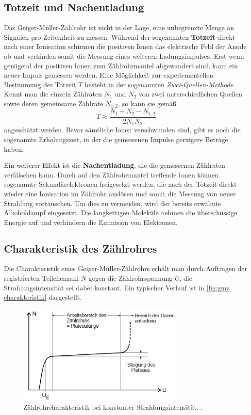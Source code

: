 \subsection{Totzeit und Nachentladung}
Das Geiger-Müller-Zählrohr ist nicht in der Lage, eine unbegrenzte Menge an Signalen pro Zeiteinheit zu messen.
Während der sogenannten \textbf{Totzeit} direkt nach einer Ionisation schirmen die positiven Ionen das elektrische Feld der Anode ab
und verhinden somit die Messung eines weiteren Ladungsimpulses.
Erst wenn genügend der positiven Ionen zum Zählrohrmantel abgewandert sind, kann ein neuer Impuls gemessen werden.
Eine Möglichkeit zur experiementellen Bestimmung der Totzeit $T$ besteht in der sogenannten \textit{Zwei-Quellen-Methode}.
Kennt man die einzeln Zählraten $N_1$ und $N_2$ von zwei unterschiedlichen Quellen sowie deren gemeinsame
Zählrate $N_{1,2}$, so kann sie gemäß
\begin{equation}
    \label{eq:2 Quellen}
    T \approx \frac{N_1 + N_2 - N_{1,2}}{2N_1 N_2}
\end{equation}
angeschätzt werden.
Bevor sämtliche Ionen verschwunden sind, gibt es noch die sogenannte Erholungszeit, in der die gemessenen Impulse
geringere Beträge haben.

Ein weiterer Effekt ist die \textbf{Nachentladung}, die die gemessenen Zählraten verfälschen kann.
Durch auf den Zählrohrmantel treffende Ionen können sogenannte Sekundärelektronen freigesetzt werden, die
nach der Totzeit direkt wieder eine Ionisation im Zählrohr auslösen und somit die Messung von neuer Strahlung vortäuschen.
Um dies zu vermeiden, wird der bereits erwähnte Alkoholdampf eingesetzt. Die langkettigen Moleküle nehmen
die überschüssige Energie auf und verhindern die Emmision von Elektronen.

\subsection{Charakteristik des Zählrohres}
Die Charakteristik eines Geiger-Müller-Zählrohrs erhält man durch Auftragen der registrierten Teilchenzahl $N$
gegen die Zählrohrspannung $U$, die Strahlungsintensität sei dabei konstant. Ein typischer Verlauf ist
in \autoref{fig:gmz charakteristik} dargestellt.

\begin{figure}[H]
    \centering
    \includegraphics[height=5cm]{content/pics/charakteristik.jpg}
    \caption{Zählrohrcharakteristik bei konstanter Strahlungsintensität. \cite{v703}.}
    \label{fig:gmz charakteristik}
\end{figure}

